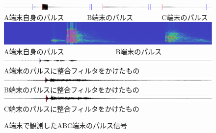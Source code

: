 \begin{figure}[pb]\centering
\vspace{2mm}
\begin{small}
\includegraphics[clip,width=1.0\hsize]{img/rawdata.png}\\
A端末自身のパルス~ ~ ~ ~
B端末のパルス~ ~ ~ ~ ~
C端末のパルス\\\vspace{0.5mm}
\includegraphics[clip,width=0.8\hsize]{img/spectrogram.png}\hspace{1cm}\\
A端末自身のパルス~ ~ ~ ~ ~ ~ ~ ~ ~
B端末のパルス\\\vspace{0.5mm}
\includegraphics[clip,width=1.0\hsize]{img/corrA.png}\\
A端末のパルスに整合フィルタをかけたもの\\\vspace{0.5mm}
\includegraphics[clip,width=1.0\hsize]{img/corrB.png}\\
B端末のパルスに整合フィルタをかけたもの\\\vspace{0.5mm}
\includegraphics[clip,width=1.0\hsize]{img/corrC.png}\\
C端末のパルスに整合フィルタをかけたもの\\
\vspace{1mm}
\caption{A端末で観測したABC端末のパルス信号}\label{fig:corr}

\end{small}
\vspace{1mm}
\end{figure}
